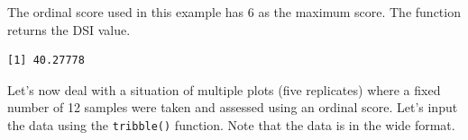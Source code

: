 \documentclass[
  letterpaper,
  DIV=11,
  numbers=noendperiod]{scrreprt}
\newenvironment{Shaded}{\begin{snugshade}}{\end{snugshade}}
\newcommand{\DecValTok}[1]{\textcolor[rgb]{0.68,0.00,0.00}{#1}}
\newcommand{\FunctionTok}[1]{\textcolor[rgb]{0.28,0.35,0.67}{#1}}
\newcommand{\NormalTok}[1]{\textcolor[rgb]{0.00,0.23,0.31}{#1}}
\newcommand{\SpecialCharTok}[1]{\textcolor[rgb]{0.37,0.37,0.37}{#1}}
\begin{document}
The ordinal score used in this example has 6 as the maximum score. The
function returns the DSI value.

\begin{Shaded}
\end{Shaded}

\begin{verbatim}
[1] 40.27778
\end{verbatim}

Let's now deal with a situation of multiple plots (five replicates)
where a fixed number of 12 samples were taken and assessed using an
ordinal score. Let's input the data using the \texttt{tribble()}
function. Note that the data is in the wide format.
\end{document}
